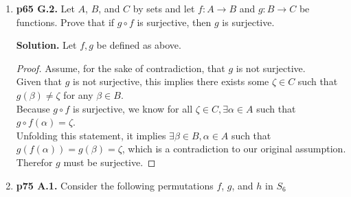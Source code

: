 \documentclass[11pt]{article}
\begin{document}
\begin{enumerate}
\item {\bfseries p65 G.2.} Let $A$, $B$, and $C$ by sets and let $f: A \rightarrow B$ and $g: B \rightarrow C$ be functions. Prove that if $g \circ f$ is surjective, then $g$ is surjective.
  
	{\bfseries Solution.} Let $f, g$ be defined as above.
  	
  	\begin{proof}
  		Assume, for the sake of contradiction, that $g$ is not surjective. \\
		Given that $g$ is not surjective, this implies there exists some $\zeta \in C$ such that $g(\beta) \neq \zeta$ for any $\beta \in B$. \\ 
		Because $g \circ f$ is surjective, we know for all $\zeta \in C, \exists \alpha \in A$ such that $g \circ f (\alpha) = \zeta$. \\
		Unfolding this statement, it implies $\exists \beta \in B, \alpha \in A$ such that $g(f(\alpha)) = g(\beta) = \zeta$, which is a contradiction to our original assumption. Therefor $g$ must be surjective.
	\end{proof}
  
\newpage

\item {\bfseries p75 A.1.} Consider the following permutations $f$, $g$, and $h$ in $S_6$


\end{enumerate}
\end{document}
